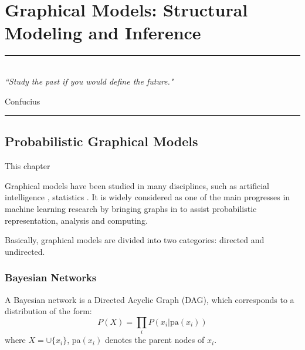 
\chapter{Graphical Models: Structural Modeling and Inference} %

\label{Chapter2} %


\rule{\textwidth}{0.4pt} \\[0.5cm]
\textit{``Study the past if you would define the future."}

\begin{flushright}
Confucius
\end{flushright}
\rule{\textwidth}{0.4pt} 




\section{Probabilistic Graphical Models}

This chapter     

Graphical models have been studied in many disciplines, such as artificial intelligence \citep{pear_1988}, statistics \citep{lauritzan_1988}.  It is widely considered 
as one of the main progresses in machine learning research by bringing graphs in to assist probabilistic representation, analysis and computing. 


Basically, graphical models are divided into two categories: directed and undirected.  

\subsection{Bayesian Networks}
\begin{definition}
 A Bayesian network is a Directed Acyclic Graph (DAG), which corresponds to a distribution of the form:
 \begin{equation}
  P(X)=\prod_i P(x_i|\text{pa}(x_i))
 \end{equation}
where $X=\cup\{x_i\}$, pa$(x_i)$ denotes the parent nodes of $x_i$. 
\end{definition}

